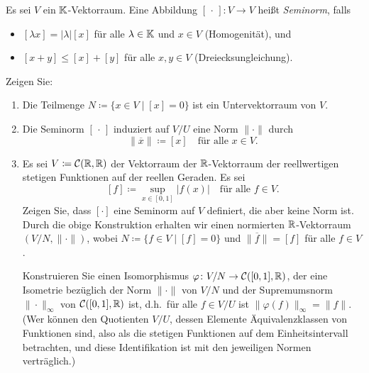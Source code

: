\begin{question}[subtitle = Seminormen induzieren Normen auf dem Quotienten]{3}
  Es sei $V$ ein $\mathbb{K}$-Vektorraum.
  Eine Abbildung $[\,\cdot\,] \colon V \to V$ heißt \emph{Seminorm}, falls
  \begin{itemize}
    \item
      $[\lambda x] = |\lambda| [x]$ für alle $\lambda \in \mathbb{K}$ und $x \in V$ (Homogenität), und
    \item
      $[x + y] \leq [x] + [y]$ für alle $x, y \in V$ (Dreiecksungleichung).
  \end{itemize}
  Zeigen Sie:
  \begin{enumerate}[leftmargin=*]
    \item
      Die Teilmenge $N \coloneqq \{x \in V \mid [x] = 0\}$ ist ein Untervektorraum von $V$.
    \item
      Die Seminorm $[\,\cdot\,]$ induziert auf $V\!/U$ eine Norm $\|\cdot\|$ durch
      \[
        \| \overline{x} \| \coloneqq [x]
        \quad
        \text{für alle $x \in V$}.
      \]
    \item
      Es sei $V \coloneqq \mathcal{C}(\mathbb{R}, \mathbb{R})$ der Vektorraum der $\mathbb{R}$-Vektorraum der reellwertigen stetigen Funktionen auf der reellen Geraden.
      Es sei
      \[
        [f] \coloneqq \sup_{x \in [0,1]} |f(x)|
        \quad
       \text{für alle $f \in V$}.
      \]
      Zeigen Sie, dass $[\cdot]$ eine Seminorm auf $V$ definiert, die aber keine Norm ist.
      Durch die obige Konstruktion erhalten wir einen normierten $\mathbb{R}$-Vektorraum $(V\!/N, \|\cdot\|)$, wobei $N \coloneqq \{f \in V \mid [f] = 0\}$ und $\|\overline{f}\| = [f]$ für alle $f \in V$.
      
      Konstruieren Sie einen Isomorphismus $\varphi \colon V\!/N \to \mathcal{C}([0,1], \mathbb{R})$, der eine Isometrie bezüglich der Norm $\|\cdot\|$ von $V\!/N$ und der Supremumsnorm $\|\cdot\|_\infty$ von $\mathcal{C}([0,1], \mathbb{R})$ ist, d.h.\ für alle $f \in V\!/U$ ist $\|\varphi(f)\|_\infty = \|f\|$.
      (Wer können den Quotienten $V\!/U$, dessen Elemente Äquivalenzklassen von Funktionen sind, also als die stetigen Funktionen auf dem Einheitsintervall betrachten, und diese Identifikation ist mit den jeweiligen Normen verträglich.)
  \end{enumerate}
\end{question}


